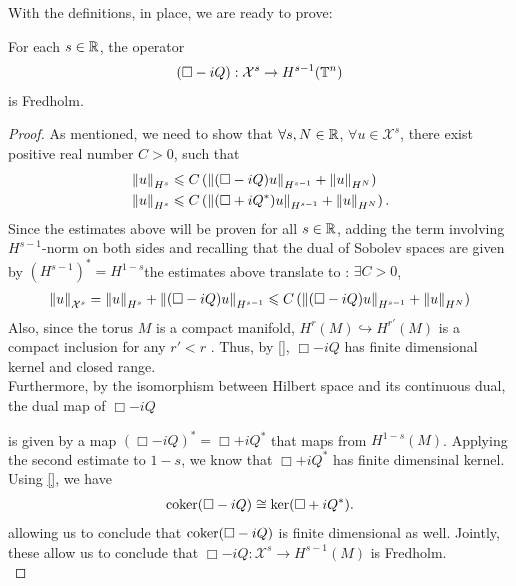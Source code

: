 \documentclass[12pt]{article}
\begin{document}
With the definitions, in place, we are ready to prove: 
\begin{ftheorem}
    For each $s \in \R$, the operator
    \begin{align*}
    (\Box - iQ): \mathcal{X}^s \to H^{s - 1}(\T^n)
    \end{align*}
    is Fredholm. 
\end{ftheorem}
\begin{proof}
    As mentioned, we need to show that $\forall s, N \in \R$, $\forall u \in \mathcal{X}^s$, there exist positive real number $C > 0$, such that
    \begin{align} \label{eq : fredholm estimate for wave operator} 
    &\norm[u]_{H^s} \leq C \brac{ \norm[(\Box - i Q)u]_{H^{s - 1}} + \norm[u]_{H^N}} \\
    &\norm[u]_{H^s} \leq C \brac{ \norm[(\Box + i Q^*)u]_{H^{s - 1}} + \norm[u]_{H^N}}. 
    \end{align}
    Since the estimates above will be proven for all $s \in \R$, adding the term involving $H^{s-1}$-norm on both sides and recalling that the dual of Sobolev spaces are given by $(H^{s - 1})^* = H^{1 - s}$the estimates above translate to : $\exists C > 0$, 
    \begin{align*}
    \norm[u]_{\mathcal{X}^s} = \norm[u]_{H^s} + \norm[(\Box - iQ)u]_{H^{s - 1}} \leq C \brac{ \norm[(\Box - i Q)u]_{H^{s - 1}} + \norm[u]_{H^N}}
    \end{align*}
    Also, since the torus $M$ is a compact manifold, $H^{r}(M) \hookrightarrow H^{r'}(M)$ is a compact inclusion for any $r' < r$ \cite{} . Thus, by \ref{}, $\Box - iQ$ has finite dimensional kernel and closed range. \\
    
    Furthermore, by the isomorphism between Hilbert space and its continuous dual, the dual map of $\Box - iQ$
    \begin{center}
    \end{center}
    is given by a map $(\Box - iQ)^* = \Box + iQ^* $ that maps from $H^{1 - s}(M)$. Applying the second estimate to $1 - s$, we know that $\Box +iQ^*$ has finite dimensinal kernel. Using \ref{}, we have 
    \begin{align*}
    \coker (\Box - iQ) \cong \ker(\Box + iQ^*). 
    \end{align*}
    allowing us to conclude that $\coker(\Box - iQ)$ is finite dimensional as well. Jointly, these allow us to conclude that $\Box - iQ : \mathcal{X}^s \to H^{s - 1}(M)$ is Fredholm. \\
    

\end{proof}
\end{document}
